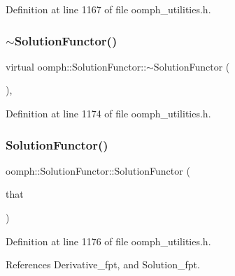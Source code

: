 Definition at line 1167 of file oomph\+\_\+utilities.\+h.

\mbox{\label{classoomph_1_1SolutionFunctor_a1fba5654355a0974ec399ae09a9fb43c}} 
\subsubsection{\texorpdfstring{$\sim$\+Solution\+Functor()}{~SolutionFunctor()}}
{\footnotesize\ttfamily virtual oomph\+::\+Solution\+Functor\+::$\sim$\+Solution\+Functor (\begin{DoxyParamCaption}{ }\end{DoxyParamCaption})\hspace{0.3cm}{\ttfamily [inline]}, {\ttfamily [virtual]}}



Definition at line 1174 of file oomph\+\_\+utilities.\+h.

\mbox{\label{classoomph_1_1SolutionFunctor_ad3573f5322c41bc9bc56667393947774}} 
\subsubsection{\texorpdfstring{Solution\+Functor()}{SolutionFunctor()}\hspace{0.1cm}{\footnotesize\ttfamily [4/4]}}
{\footnotesize\ttfamily oomph\+::\+Solution\+Functor\+::\+Solution\+Functor (\begin{DoxyParamCaption}\item[{const \hyperlink{classoomph_1_1SolutionFunctor}{Solution\+Functor} \&}]{that }\end{DoxyParamCaption})\hspace{0.3cm}{\ttfamily [inline]}}



Definition at line 1176 of file oomph\+\_\+utilities.\+h.



References Derivative\+\_\+fpt, and Solution\+\_\+fpt.



